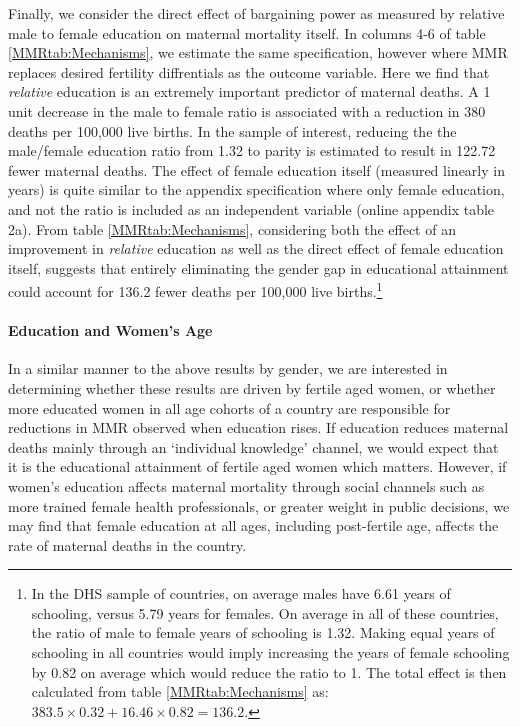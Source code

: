 \documentclass{article}[12pt,subeqn]
\begin{document}
\begin{spacing}{1.4}
Finally, we consider the direct effect of bargaining power as measured by relative
male to female education on maternal mortality itself.  In columns 4-6 of table
\ref{MMRtab:Mechanisms}, we estimate the same specification, however where MMR
replaces desired fertility diffrentials as
the outcome variable.  Here we find that \emph{relative} education is an
extremely important predictor of maternal deaths.  A 1 unit decrease in the male
to female ratio is associated with a reduction in 380 deaths per 100,000 live
births.  In the sample of interest, reducing the the male/female education ratio
from 1.32 to parity is estimated to result in 122.72 fewer maternal deaths.  The
effect of female education itself (measured linearly in years) is quite similar
to the appendix specification where only female education, and not the ratio
is included as an independent variable (online appendix table 2a).  From table
\ref{MMRtab:Mechanisms}, considering both the effect of an improvement in
\emph{relative} education as well as the direct effect of female education itself,
suggests that entirely eliminating the gender gap in educational attainment
could account for 136.2 fewer deaths per 100,000 live births.\footnote{In the
  DHS sample of countries, on average males have 6.61 years of schooling, versus
  5.79 years for females.  On average in all of these countries, the ratio of male to
  female years of schooling is 1.32. Making equal years of schooling in all countries
  would imply increasing the years of female schooling by 0.82 on average which would
  reduce the ratio to 1.  The total effect is then calculated from table
  \ref{MMRtab:Mechanisms} as: $383.5\times 0.32+16.46\times 0.82=136.2$.}


\paragraph{Education and Women's Age}
\label{ssscn:age}
In a similar manner to the above results by gender, we are interested in
determining whether these results are driven by fertile aged women, or whether
more educated women in all age cohorts of a country are responsible for
reductions in MMR observed when education rises.  If education reduces maternal
deaths mainly through an `individual knowledge' channel, we would expect that
it is the educational attainment of fertile aged women which matters.  However,
if women's education affects maternal mortality through social channels such as
more trained female health professionals, or greater weight in public decisions,
we may find that female education at all ages, including post-fertile age, affects
the rate of maternal deaths in the country.


\end{spacing}
\end{document}
